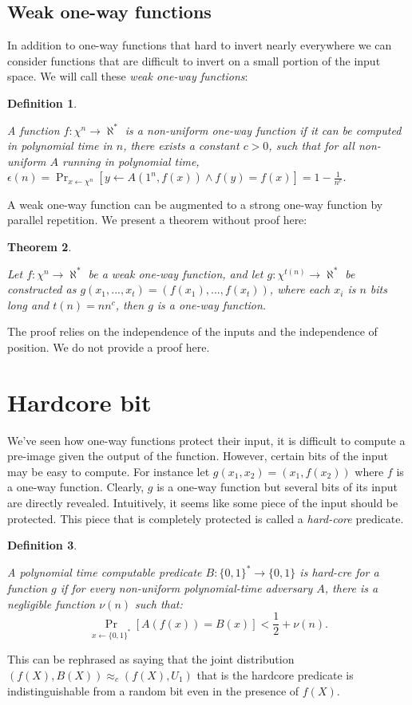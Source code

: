 \documentclass{article}
\newtheorem{thm}{Theorem}[section]
\newtheorem{defn}[thm]{Definition}
\newenvironment{theorem}{\begin{thm}\begin{rm}}%
{\end{rm}\end{thm}}
\newenvironment{definition}{\begin{defn}\begin{em}}%
{\end{em}\end{defn}}
\begin{document}
\subsection{Weak one-way functions}
In addition to one-way functions that hard to invert nearly everywhere we can consider functions that are difficult to invert on a small portion of the input space.  We will call these \emph{weak one-way functions}:
\begin{definition}
A function $f:\chi^n\rightarrow \aleph^*$ is a \emph{non-uniform one-way} function if it can be computed in polynomial time in $n$, there exists a constant $c>0$, such that for all non-uniform $A$ running in polynomial time, 
$\epsilon(n) = \Pr_{x\leftarrow \chi^n}[y\leftarrow A(1^n, f(x)) \wedge f(y) = f(x)] = 1-\frac{1}{n^c}$.
\end{definition}
A weak one-way function can be augmented to a strong one-way function by parallel repetition.  We present a theorem without proof here:
\begin{theorem}
Let $f:\chi^n\rightarrow \aleph^*$ be a weak one-way function, and let $g:\chi^{t(n)}\rightarrow \aleph^*$ be constructed as $g(x_1,...,x_t) = (f(x_1),...,f(x_t))$, where each $x_i$ is $n$ bits long and $t(n) = nn^c$, then $g$ is a one-way function.
\end{theorem}
The proof relies on the independence of the inputs and the independence of position.  We do not provide a proof here.
\section{Hardcore bit}
We've seen how one-way functions protect their input, it is difficult to compute a pre-image given the output of the function.  However, certain bits of the input may be easy to compute.  For instance let $g(x_1, x_2) = (x_1, f(x_2))$ where $f$ is a one-way function.  Clearly, $g$ is a one-way function but several bits of its input are directly revealed.  Intuitively, it seems like some piece of the input should be protected.  This piece that is completely protected is called a \emph{hard-core} predicate.

\begin{definition}
A polynomial time computable predicate $B: \{0,1\}^*\rightarrow \{0,1\}$ is \emph{hard-cre} for a function $g$ if for every non-uniform polynomial-time adversary $A$, there is a negligible function $\nu(n)$ such that:
\[
\Pr_{x\leftarrow \{0,1\}^*}[A(f(x)) = B(x)] <\frac{1}{2}+\nu(n).
\]
\end{definition}
This can be rephrased as saying that the joint distribution $(f(X), B(X))\approx_c (f(X), U_1)$ that is the hardcore predicate is indistinguishable from a random bit even in the presence of $f(X)$.
\end{document}
